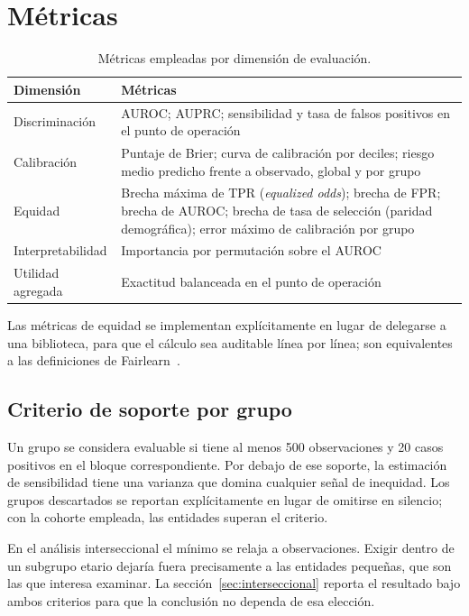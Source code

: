\section{Métricas}

\begin{table}[htbp]
\centering
\caption{Métricas empleadas por dimensión de evaluación.}
\label{tab:metricas}
\small
\begin{tabular}{p{3.4cm} p{10.4cm}}
\toprule
Dimensión & Métricas \\
\midrule
Discriminación & AUROC; AUPRC; sensibilidad y tasa de falsos positivos en el punto de operación \\
Calibración & Puntaje de Brier; curva de calibración por deciles; riesgo medio predicho frente a observado, global y por grupo \\
Equidad & Brecha máxima de TPR (\emph{equalized odds}); brecha de FPR; brecha de AUROC; brecha de tasa de selección (paridad demográfica); error máximo de calibración por grupo \\
Interpretabilidad & Importancia por permutación sobre el AUROC \\
Utilidad agregada & Exactitud balanceada en el punto de operación \\
\bottomrule
\end{tabular}
\end{table}

Las métricas de equidad se implementan explícitamente en lugar de delegarse a una
biblioteca, para que el cálculo sea auditable línea por línea; son equivalentes a
las definiciones de Fairlearn~\parencite{fairlearn2020}.

\subsection{Criterio de soporte por grupo}

Un grupo se considera evaluable si tiene al menos 500 observaciones y 20 casos
positivos en el bloque correspondiente. Por debajo de ese soporte, la estimación
de sensibilidad tiene una varianza que domina cualquier señal de inequidad. Los
grupos descartados se reportan explícitamente en lugar de omitirse en silencio;
con la cohorte empleada, las \nEntidades{} entidades superan el criterio.

En el análisis interseccional el mínimo se relaja a \interMinN{} observaciones.
Exigir  dentro de un subgrupo etario dejaría fuera precisamente a
las entidades pequeñas, que son las que interesa examinar. La
sección~\ref{sec:interseccional} reporta el resultado bajo ambos criterios para
que la conclusión no dependa de esa elección.

